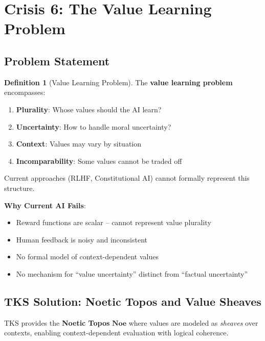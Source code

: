 \documentclass[11pt,twoside]{article}
\theoremstyle{definition}
\newtheorem{definition}{Definition}[section]
\theoremstyle{plain}
\theoremstyle{remark}
\newcommand{\NoeticTopos}{\mathbf{Noe}}
\begin{document}
\section{Crisis 6: The Value Learning Problem}
\label{sec:value-learning}

\subsection{Problem Statement}

\begin{definition}[Value Learning Problem]
\label{def:value-problem}
The \textbf{value learning problem} encompasses:
\begin{enumerate}
  \item \textbf{Plurality}: Whose values should the AI learn?
  \item \textbf{Uncertainty}: How to handle moral uncertainty?
  \item \textbf{Context}: Values may vary by situation
  \item \textbf{Incomparability}: Some values cannot be traded off
\end{enumerate}
Current approaches (RLHF, Constitutional AI) cannot formally represent this structure.
\end{definition}

\textbf{Why Current AI Fails}:
\begin{itemize}
  \item Reward functions are scalar -- cannot represent value plurality
  \item Human feedback is noisy and inconsistent
  \item No formal model of context-dependent values
  \item No mechanism for ``value uncertainty'' distinct from ``factual uncertainty''
\end{itemize}

\subsection{TKS Solution: Noetic Topos and Value Sheaves}

TKS provides the \textbf{Noetic Topos} $\NoeticTopos$ where values are modeled as
\emph{sheaves} over contexts, enabling context-dependent evaluation with logical coherence.
\end{document}
